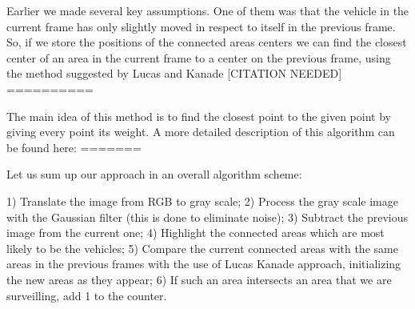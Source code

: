 \documentclass[12pt,a4paper,oneside,titlepage]{article}
\begin{document}


Earlier we made several key assumptions.
One of them was that the vehicle in the current frame has only slightly moved in respect to itself in the previous frame.
So, if we store the positions of the connected areas centers we can find the closest center of an area in the current frame to a center on the previous frame, using the method suggested by Lucas and Kanade [CITATION NEEDED] ==========

The main idea of this method is to find the closest point to the given point by giving every point its weight.
A more detailed description of this algorithm can be found here: =======



Let us sum up our approach in an overall algorithm scheme:

1) Translate the image from RGB to gray scale;
2) Process the gray scale image with the Gaussian filter (this is done to eliminate noise);
3) Subtract the previous image from the current one;
4) Highlight the connected areas which are most likely to be the vehicles;
5) Compare the current connected areas with the same areas in the previous frames with the use of Lucas Kanade approach, initializing the new areas as they appear;
6) If such an area intersects an area that we are surveilling, add 1 to the counter.




\end{document}
